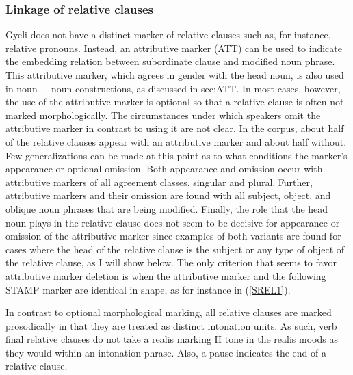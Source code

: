 




\subsubsection{Linkage of relative clauses}
\label{sec:RELlink} 

Gyeli does not have a distinct marker of relative clauses such as, for instance, relative pronouns. Instead, an attributive marker (ATT) can be used to indicate the embedding relation between subordinate clause and modified noun phrase. This attributive marker, which agrees in gender with the head noun, is also used in noun + noun constructions, as discussed in {sec:ATT}. In most cases, however, the use of the attributive marker is optional so that a relative clause is often not marked morphologically. The circumstances under which speakers omit the attributive marker in contrast to using it are not clear. In the corpus, about half of the relative clauses appear with an attributive marker and about half without. Few generalizations can be made at this point as to what conditions the marker's appearance or optional omission. Both appearance and omission occur with attributive markers of all agreement classes, singular and plural. Further, attributive markers and their omission are found with all subject, object, and oblique noun phrases that are being modified. Finally, the role that the head noun plays in the relative clause does not seem to be decisive for appearance or omission of the attributive marker since examples of both variants are found for cases where the head of the relative clause is the subject or any type of object of the relative clause, as I will show below.  The only criterion that seems to favor attributive marker deletion is when the attributive marker and the following STAMP marker are identical in shape, as for instance in (\ref{SREL1}).

In contrast to optional morphological marking, all relative clauses are marked prosodically in that they are treated as distinct intonation units. As such, verb final relative clauses do not take a realis marking H tone in the realis moods as they would within an intonation phrase. Also, a pause indicates the end of a relative clause.




